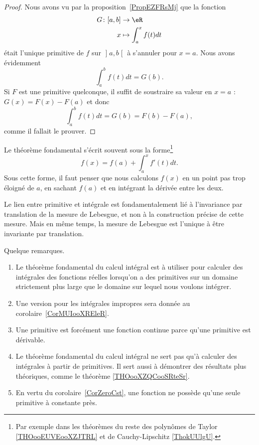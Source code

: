 \begin{proof}
    Nous avons vu par la proposition~\ref{PropEZFRsMj} que la fonction
    \begin{equation}
        \begin{aligned}
            G\colon \mathopen[ a , b \mathclose]&\to \eR \\
            x&\mapsto  \int_a^xf(t)dt
        \end{aligned}
    \end{equation}
    était l'unique primitive de \( f\) sur \( \mathopen] a , b \mathclose[\) à s'annuler pour \( x=a\). Nous avons évidemment
    \begin{equation}
        \int_a^bf(t)dt=G(b).
    \end{equation}
    Si \( F\) est une primitive quelconque, il suffit de soustraire sa valeur en \( x=a\) : \( G(x)=F(x)-F(a)\) et donc
    \begin{equation}
        \int_a^bf(t)dt=G(b)=F(b)-F(a),
    \end{equation}
    comme il fallait le prouver.
\end{proof}

Le théorème fondamental s'écrit souvent sous la forme\footnote{Par exemple dans les théorèmes du reste des polynômes de Taylor \ref{THOooEUVEooXZJTRL} et de Cauchy-Lipschitz \ref{ThokUUlgU}.}
\begin{equation}        \label{EqooBBCYooNweVrF}
    f(x)=f(a)+\int_a^xf'(t)dt.
\end{equation}
Sous cette forme, il faut penser que nous calculons \( f(x)\) en un point pas trop éloigné de \( a\), en sachant \( f(a)\) et en intégrant la dérivée entre les deux.

\begin{remark}
    Le lien entre primitive et intégrale est fondamentalement lié à l'invariance par translation de la mesure de Lebesgue, et non à la construction précise de cette mesure. Mais en même temps, la mesure de Lebesgue est l'unique à être invariante par translation.
\end{remark}

Quelque remarques.
\begin{enumerate}
    \item
        Le théorème fondamental du calcul intégral est à utiliser pour calculer des intégrales des fonctions réelles lorsqu'on a des primitives sur un domaine strictement plus large que le domaine sur lequel nous voulons intégrer.
    \item
        Une version pour les intégrales impropres sera donnée au corolaire~\ref{CorMUIooXREleR}.
    \item
    Une primitive est forcément une fonction continue parce qu'une primitive est dérivable.
\item
    Le théorème fondamental du calcul intégral ne sert pas qu'à calculer des intégrales à partir de primitives. Il sert aussi à démontrer des résultats plus théoriques, comme le théorème \ref{THOooXZQCooSRteSr}.
    \item
        En vertu du corolaire~\ref{CorZeroCst}, une fonction ne possède qu'une seule primitive à constante près.
\end{enumerate}



